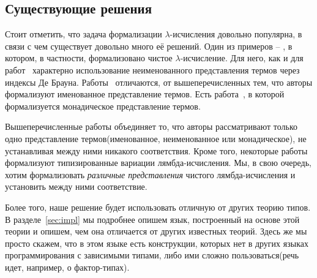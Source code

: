 \subsection{Существующие решения}

Стоит отметить, что задача формализации $\lambda$-исчисления довольно популярна, в связи с чем существует довольно много её решений. Один из примеров -- \cite{lambdaForm}, в котором, в частности, формализовано чистое $\lambda$-исчисление. Для него, как и для работ~\cite{shankar1988mechanical, altenkirch1993formalization, barras1996coq, nipkow1996more, huet1994residual} характерно использование неименованного представления термов через индексы Де Брауна. Работы~\cite{mckinna1999some, coquand1996algorithm, gabbay1999new, gordon1996five, sato1983theory, stoughton1988substitution} отличаются, от вышеперечисленных тем, что авторы формализуют именованное представление термов. Есть работа~\cite{altenkirch1999monadic}, в которой формализуется монадическое представление термов.

Вышеперечисленные работы объединяет то, что авторы рассматривают только одно представление термов(именованное, неименованное или монадическое), не устанавливая между ними никакого соответствия. Кроме того, некоторые работы формализуют типизированные вариации лямбда-исчисления. Мы, в свою очередь, хотим формализовать \textit{различные представления} чистого лямбда-исчисления и установить между ними соответствие.

Более того, наше решение будет использовать отличную от других теорию типов. В разделе~\ref{sec:impl} мы подробнее опишем язык, построенный на основе этой теории и опишем, чем она отличается от других известных теорий. Здесь же мы просто скажем, что в этом языке есть конструкции, которых нет в других языках программирования с зависимыми типами, либо ими сложно пользоваться(речь идет, например, о фактор-типах).
